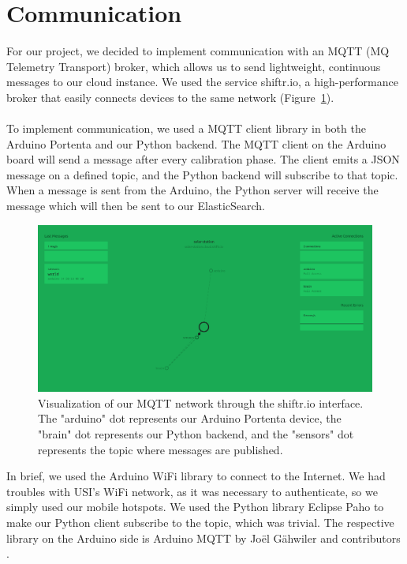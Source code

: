 \section*{Communication}

For our project, we decided to implement communication with an MQTT (MQ Telemetry Transport) broker, which allows us to send lightweight, continuous messages to our cloud instance.
We used the service shiftr.io, a high-performance broker that easily connects devices to the same network (Figure~\ref{fig:shiftrviz}). \\ \\
To implement communication, we used a MQTT client library in both the Arduino Portenta and our Python backend.
The MQTT client on the Arduino board will send a message after every calibration phase.
The client emits a JSON message on a defined topic, and the Python backend will subscribe to that topic.
When a message is sent from the Arduino, the Python server will receive the message which will then be sent to our ElasticSearch.
\begin{figure}[H]
    \centering
    \includegraphics[width=15cm]{../assets/png/shiftr-network}
    \caption{Visualization of our MQTT network through the shiftr.io interface. The "arduino" dot represents our Arduino Portenta device, the "brain" dot represents our Python backend, and the "sensors" dot represents the topic where messages are published.}
    \label{fig:shiftrviz}
\end{figure}
In brief, we used the Arduino WiFi library to connect to the Internet.
We had troubles with USI's WiFi network, as it was necessary to authenticate, so we simply used our mobile hotspots.
We used the Python library Eclipse Paho \cite{paho} to make our Python client subscribe to the topic, which was trivial.
The respective library on the Arduino side is Arduino MQTT by Joël Gähwiler and contributors \cite{arduinomqtt}.
